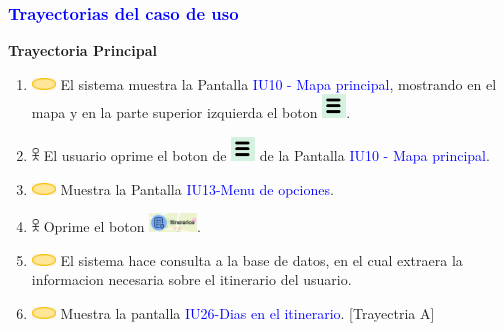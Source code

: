 \subsubsection{\textcolor{blue}{Trayectorias del caso de uso}}
\textbf{Trayectoria Principal}
    \begin{enumerate}
        \item \includegraphics[width=0.0500\textwidth]{Figuras/sistema.png}  El sistema muestra la Pantalla \textcolor{blue}{IU10 - Mapa principal}, mostrando en el mapa y en la parte superior izquierda el boton \includegraphics[width=0.05\textwidth]{ComponentesCU/img4.png}.
        \item \includegraphics[width=0.0150\textwidth]{Figuras/persona.png} El usuario oprime el boton de \includegraphics[width=0.05\textwidth]{ComponentesCU/img4.png}  de la Pantalla \textcolor{blue}{IU10 - Mapa principal}.
        \item \includegraphics[width=0.0500\textwidth]{Figuras/sistema.png} Muestra la Pantalla \textcolor{blue}{IU13-Menu de opciones}.
        \item \includegraphics[width=0.0150\textwidth]{Figuras/persona.png} Oprime el boton \includegraphics[width=0.1\textwidth]{ComponentesCU/img5.png}.
        \item \includegraphics[width=0.0500\textwidth]{Figuras/sistema.png} El sistema hace consulta a la base de datos, en el cual extraera la informacion necesaria sobre el itinerario del usuario.
         \item \includegraphics[width=0.0500\textwidth]{Figuras/sistema.png} Muestra la pantalla \textcolor{blue}{IU26-Dias en el itinerario}. [Trayectria A]
    \end{enumerate}
